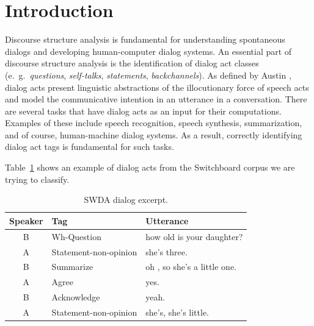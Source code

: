 \section{Introduction}\label{sec:intro}
Discourse structure analysis is fundamental for understanding spontaneous dialogs and developing human-computer dialog systems.
An essential part of discourse structure analysis is the identification of dialog act classes (e.\ g.\ \emph{questions}, \emph{self-talks}, \emph{statements}, \emph{backchannels}).
As defined by Austin , dialog acts present linguistic abstractions of the illocutionary force of speech acts and model the communicative intention in an utterance in a conversation. There are several tasks that have dialog acts as an input for their computations. Examples of these include speech recognition, speech synthesis, summarization, and of course, human-machine dialog systems. As a result, correctly identifying dialog act tags is fundamental for such tasks.


Table~\ref{tab:swda_example} shows an example of dialog acts from the Switchboard corpus we are trying to classify.

\begin{table}[h]
\centering
\begin{tabular}{c l l}
\hline
\textbf{Speaker} & \textbf{Tag} & \textbf{Utterance}
\\
\hline
B & Wh-Question & how old is your daughter?\\
A & Statement-non-opinion & she's three.\\
B & Summarize & oh , so she's a little one.\\
A & Agree & yes.\\
B & Acknowledge & yeah.\\
A & Statement-non-opinion & she's, she's little.\\
\hline
\end{tabular}
\caption{SWDA dialog excerpt.}
\label{tab:swda_example}
\end{table}

